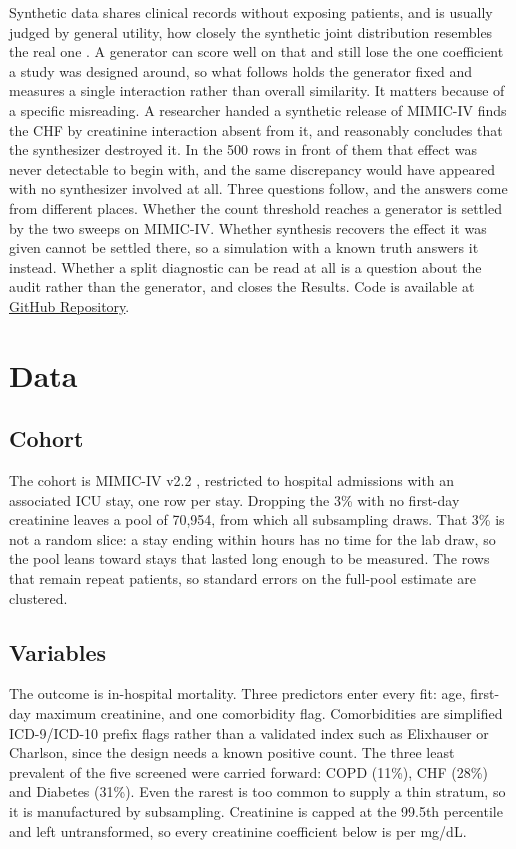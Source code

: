 \documentclass[11pt]{article}
\begin{document}
Synthetic data shares clinical records without exposing patients, and is usually
judged by general utility, how closely the synthetic joint distribution
resembles the real one \cite{snoke2018}. A generator can score well on that and
still lose the one coefficient a study was designed around, so what follows
holds the generator fixed and measures a single interaction rather than overall
similarity. It matters because of a specific misreading. A researcher handed a
synthetic release of MIMIC-IV finds the CHF by creatinine interaction absent
from it, and reasonably concludes that the synthesizer destroyed it. In the 500
rows in front of them that effect was never detectable to begin with, and the
same discrepancy would have appeared with no synthesizer involved at all.
Three questions follow, and the answers come from different places. Whether the
count threshold reaches a generator is settled by the two sweeps on MIMIC-IV.
Whether synthesis recovers the effect it was given cannot be settled there, so a
simulation with a known truth answers it instead. Whether a split diagnostic can be read at
all is a question about the audit rather than the generator, and closes the
Results. Code is available at
\href{https://github.com/ShengPeiWilliam/mimic-synthetic-fidelity}{GitHub Repository}.

\section{Data}

\subsection{Cohort}

The cohort is MIMIC-IV v2.2 \cite{johnson2023}, restricted to hospital
admissions with an associated ICU stay, one row per stay. Dropping the 3\% with
no first-day creatinine leaves a pool of 70{,}954, from which all subsampling
draws. That 3\% is not a random slice: a stay ending within hours has no time
for the lab draw, so the pool leans toward stays that lasted long enough to be
measured. The rows that remain repeat patients, so standard errors on the
full-pool estimate are clustered.

\subsection{Variables}

The outcome is in-hospital mortality. Three predictors enter every fit: age,
first-day maximum creatinine, and one comorbidity flag. Comorbidities are simplified ICD-9/ICD-10 prefix flags rather
than a validated index such as Elixhauser or Charlson, since the design needs a
known positive count. The three least prevalent of the five screened were
carried forward: COPD (11\%), CHF (28\%) and Diabetes (31\%). Even the rarest is
too common to supply a thin stratum, so it is manufactured by subsampling.
Creatinine is capped at the 99.5th percentile and left untransformed, so every
creatinine coefficient below is per mg/dL.
\end{document}
